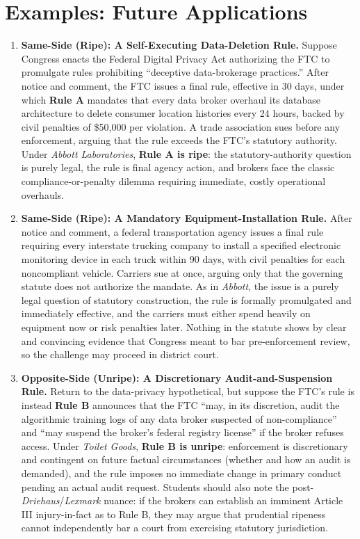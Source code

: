 \documentclass[12pt]{article}
\begin{document}
\section{Examples: Future Applications}
\begin{enumerate}

\item \textbf{Same-Side (Ripe): A Self-Executing Data-Deletion Rule.} Suppose Congress enacts the Federal Digital Privacy Act authorizing the FTC to promulgate rules prohibiting ``deceptive data-brokerage practices.'' After notice and comment, the FTC issues a final rule, effective in 30 days, under which \textbf{Rule A} mandates that every data broker overhaul its database architecture to delete consumer location histories every 24 hours, backed by civil penalties of \$50,000 per violation. A trade association sues before any enforcement, arguing that the rule exceeds the FTC's statutory authority. Under \textit{Abbott Laboratories}, \textbf{Rule A is ripe}: the statutory-authority question is purely legal, the rule is final agency action, and brokers face the classic compliance-or-penalty dilemma requiring immediate, costly operational overhauls.

\item \textbf{Same-Side (Ripe): A Mandatory Equipment-Installation Rule.} After notice and comment, a federal transportation agency issues a final rule requiring every interstate trucking company to install a specified electronic monitoring device in each truck within 90 days, with civil penalties for each noncompliant vehicle. Carriers sue at once, arguing only that the governing statute does not authorize the mandate. As in \textit{Abbott}, the issue is a purely legal question of statutory construction, the rule is formally promulgated and immediately effective, and the carriers must either spend heavily on equipment now or risk penalties later. Nothing in the statute shows by clear and convincing evidence that Congress meant to bar pre-enforcement review, so the challenge may proceed in district court.

\item \textbf{Opposite-Side (Unripe): A Discretionary Audit-and-Suspension Rule.} Return to the data-privacy hypothetical, but suppose the FTC's rule is instead \textbf{Rule B} announces that the FTC ``may, in its discretion, audit the algorithmic training logs of any data broker suspected of non-compliance'' and ``may suspend the broker's federal registry license'' if the broker refuses access. Under \textit{Toilet Goods}, \textbf{Rule B is unripe}: enforcement is discretionary and contingent on future factual circumstances (whether and how an audit is demanded), and the rule imposes no immediate change in primary conduct pending an actual audit request. Students should also note the post-\textit{Driehaus}/\textit{Lexmark} nuance: if the brokers can establish an imminent Article III injury-in-fact as to Rule B, they may argue that prudential ripeness cannot independently bar a court from exercising statutory jurisdiction.


\end{enumerate}
\end{document}
